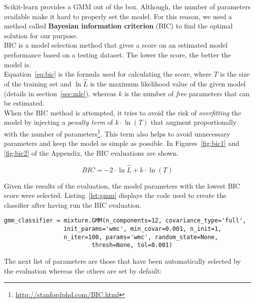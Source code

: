 \noindent Scikit-learn provides a GMM out of the box. Although, the number of parameters available make it hard to properly set the model. For this reason, we used a method called \textbf{Bayesian information criterion} (BIC) to find the optimal solution for our purpose. \\

\noindent BIC is a model selection method that gives a score on an estimated model performance based on a testing dataset. The lower the score, the better the model is. \\
\noindent Equation~\ref{eq:bic} is the formula used for calculating the score, where $T$ is the size of the training set and $\ln{\hat L}$ is the maximum likelihood value of the given model (details in section~\ref{sec:mle}), whereas $k$ is the number of \textit{free} parameters that can be estimated. \\

\noindent When the BIC method is attempted, it tries to avoid the risk of \textit{overfitting} the model by injecting a \textit{penalty term} of $k \cdot \ln(T)$ that augment proportionally with the number of parameters\footnote{\url{http://stanfordphd.com/BIC.html}}. This term also helps to avoid unnecessary parameters and keep the model as simple as possible. In Figures~\ref{fig:bic1} and \ref{fig:bic2} of the Appendix, the BIC evaluations are shown.

\begin{equation}
\label{eq:bic}
	 BIC = -2 \cdot \ln{\hat L} + k \cdot \ln(T)
\end{equation}

\noindent Given the results of the evaluation, the model parameters with the lowest BIC score were selected. Listing~\ref{lst:gmm} displays the code used to create the classifier after having run the BIC evaluation.

\begin{lstlisting}[caption={Parameters of GMM classifier},label={lst:gmm}, style=BashInputStyle]
gmm_classifier = mixture.GMM(n_components=12, covariance_type='full',
			     init_params='wmc', min_covar=0.001, n_init=1,
			     n_iter=100, params='wmc', random_state=None,
	                     thresh=None, tol=0.001)
\end{lstlisting}

\clearpage

\noindent The next list of parameters are those that have been automatically selected by the evaluation whereas the others are set by default:

